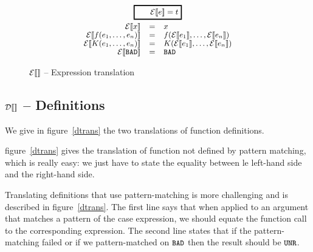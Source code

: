 \documentclass[preprint]{sigplanconf}
\begin{document}
\begin{figure}
$$
\begin{array}{rcl}
\multicolumn{3}{c}{\ruleform{\etrans{e} = t}} \\[2.5mm]
 \etrans{x} &=& x\\
  \etrans{f(e_1,\dots,e_n)} &=& f(\etrans{e_1},\dots,\etrans{e_n})\\
  \etrans{K(e_1,\dots,e_n)} &=& K(\etrans{e_1},\dots,\etrans{e_n})\\
  \etrans{\bad} &=& \bad
\end{array}
$$
\caption{$\etrans{}$ -- Expression translation}
\label{etrans}
\end{figure}

\subsection{$\dtrans{}$ -- Definitions}
We give in figure~\ref{dtrans} the two translations of function
definitions.

figure~\ref{dtrans} gives the translation of function not defined by
pattern matching, which is really easy: we just have to state the
equality between le left-hand side and the right-hand side.

Translating definitions that use pattern-matching is more challenging
and is described in figure~\ref{dtrans}.  The first line says that
when applied to an argument that matches a pattern of the case
expression, we should equate the function call to the corresponding
expression. The second line states that if the pattern-matching failed
or if we pattern-matched on $\bad$ then the result should be
$\unr$.
\end{document}
